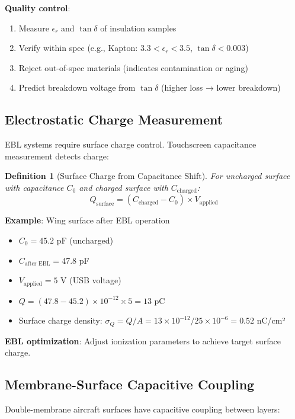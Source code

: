 \documentclass[12pt,a4paper]{article}
\newtheorem{definition}{Definition}
\begin{document}
\textbf{Quality control}:
\begin{enumerate}
\item Measure $\epsilon_r$ and $\tan\delta$ of insulation samples
\item Verify within spec (e.g., Kapton: $3.3 < \epsilon_r < 3.5$, $\tan\delta < 0.003$)
\item Reject out-of-spec materials (indicates contamination or aging)
\item Predict breakdown voltage from $\tan\delta$ (higher loss → lower breakdown)
\end{enumerate}

\subsection{Electrostatic Charge Measurement}

EBL systems require surface charge control. Touchscreen capacitance measurement detects charge:

\begin{definition}[Surface Charge from Capacitance Shift]
For uncharged surface with capacitance $C_0$ and charged surface with $C_{\text{charged}}$:
\begin{equation}
Q_{\text{surface}} = (C_{\text{charged}} - C_0) \times V_{\text{applied}}
\end{equation}
\end{definition}

\textbf{Example}: Wing surface after EBL operation
\begin{itemize}
\item $C_0 = 45.2$ pF (uncharged)
\item $C_{\text{after EBL}} = 47.8$ pF
\item $V_{\text{applied}} = 5$ V (USB voltage)
\item $Q = (47.8 - 45.2) \times 10^{-12} \times 5 = 13$ pC
\item Surface charge density: $\sigma_Q = Q/A = 13 \times 10^{-12} / 25 \times 10^{-6} = 0.52$ nC/cm²
\end{itemize}

\textbf{EBL optimization}: Adjust ionization parameters to achieve target surface charge.

\subsection{Membrane-Surface Capacitive Coupling}

Double-membrane aircraft surfaces have capacitive coupling between layers:
\end{document}
